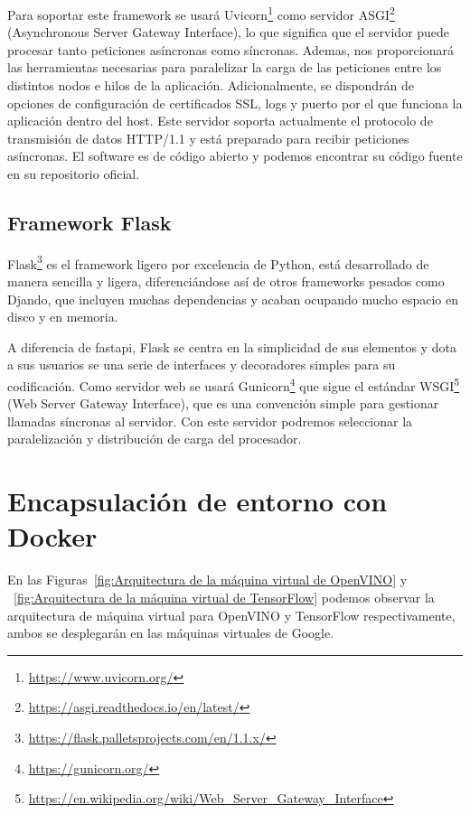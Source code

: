 Para soportar este framework se usará Uvicorn\footnote{\url{https://www.uvicorn.org/}} como servidor ASGI\footnote{\url{https://asgi.readthedocs.io/en/latest/}} (Asynchronous Server Gateway Interface), lo que significa que el servidor puede procesar tanto peticiones asíncronas como síncronas.
Ademas, nos proporcionará las herramientas necesarias para paralelizar la carga de las peticiones entre los distintos nodos e hilos de la aplicación.
Adicionalmente, se dispondrán de opciones de configuración de certificados SSL, logs y puerto por el que funciona la aplicación dentro del host.
Este servidor soporta actualmente el protocolo de transmisión de datos HTTP/1.1 y está preparado para recibir peticiones asíncronas.
El software es de código abierto y podemos encontrar su código fuente en su repositorio oficial.


\subsection{Framework Flask}\label{subsec:framework-flask}
Flask\footnote{\url{https://flask.palletsprojects.com/en/1.1.x/}} es el framework ligero por excelencia de Python, está desarrollado de manera sencilla y ligera, diferenciándose así de otros frameworks pesados como Djando, que incluyen
muchas dependencias y acaban ocupando mucho espacio en disco y en memoria.

A diferencia de fastapi, Flask se centra en la simplicidad de sus elementos y dota a sus usuarios se una serie de interfaces y decoradores simples para su codificación.
Como servidor web se usará Gunicorn\footnote{\url{https://gunicorn.org/}} que sigue el estándar WSGI\footnote{\url{https://en.wikipedia.org/wiki/Web\_Server\_Gateway\_Interface}} (Web Server Gateway Interface), que es una convención simple para gestionar llamadas síncronas al servidor.
Con este servidor podremos seleccionar la paralelización y distribución de carga del procesador.
\section{Encapsulación de entorno con Docker}\label{sec:encapsulación-de-entorno-con-docker}
En las Figuras~\ref{fig:Arquitectura de la máquina virtual de OpenVINO} y ~\ref{fig:Arquitectura de la máquina virtual de TensorFlow} podemos observar la arquitectura de máquina virtual para OpenVINO y TensorFlow respectivamente, ambos se desplegarán en las máquinas virtuales de Google.

